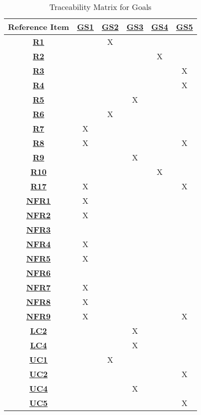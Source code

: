 \begin{table}[ht]
\centering
\begin{tabular}{|c|c|c|c|c|c|}
\hline
\textbf{Reference Item} &
\hyperref[G_enjoyable]{\textbf{GS1}} &
\hyperref[G_multiplayer]{\textbf{GS2}} &
\hyperref[G_customization]{\textbf{GS3}} &
\hyperref[G_presets]{\textbf{GS4}} &
\hyperref[G_3D]{\textbf{GS5}} \\ \hline
\hyperref[R1]{\textbf{R1}} & &X & & & \\ \hline
\hyperref[R2]{\textbf{R2}} & & & &X & \\ \hline
\hyperref[R3]{\textbf{R3}} & & & & &X \\ \hline
\hyperref[R4]{\textbf{R4}} & & & & &X \\ \hline
\hyperref[R5]{\textbf{R5}} & & &X & & \\ \hline
\hyperref[R6]{\textbf{R6}} & &X & & & \\ \hline
\hyperref[R7]{\textbf{R7}} &X & & & & \\ \hline
\hyperref[R8]{\textbf{R8}} &X & & & &X \\ \hline
\hyperref[R9]{\textbf{R9}} & & &X & & \\ \hline
\hyperref[R10]{\textbf{R10}} & & & &X & \\ \hline
\hyperref[R17]{\textbf{R17}} &X & & & &X \\ \hline
\hyperref[NFR1]{\textbf{NFR1}} &X & & & & \\ \hline
\hyperref[NFR2]{\textbf{NFR2}} &X & & & & \\ \hline
\hyperref[NFR3]{\textbf{NFR3}} & & & & & \\ \hline
\hyperref[NFR4]{\textbf{NFR4}} &X & & & & \\ \hline
\hyperref[NFR5]{\textbf{NFR5}} &X & & & & \\ \hline
\hyperref[NFR6]{\textbf{NFR6}} & & & & & \\ \hline
\hyperref[NFR7]{\textbf{NFR7}} &X & & & & \\ \hline
\hyperref[NFR8]{\textbf{NFR8}} &X & & & & \\ \hline
\hyperref[NFR9]{\textbf{NFR9}} &X & & & &X \\ \hline
\hyperref[LC_dice]{\textbf{LC2}} & & &X & & \\ \hline
\hyperref[LC_score_calc]{\textbf{LC4}} & & &X & & \\ \hline
\hyperref[ULC_multiplayer]{\textbf{UC1}} & &X & & & \\ \hline
\hyperref[ULC_dice]{\textbf{UC2}} & & & & &X \\ \hline
\hyperref[ULC_customization]{\textbf{UC4}} & & &X & & \\ \hline
\hyperref[ULC_3D]{\textbf{UC5}} & & & & &X \\ \hline
\end{tabular}
\caption{Traceability Matrix for Goals}
\label{table:goals_traceability}
\end{table}


